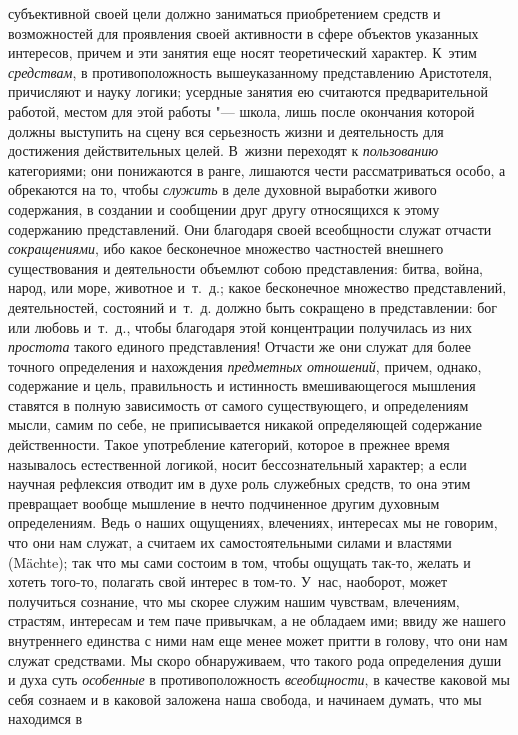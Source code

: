 субъективной своей цели должно заниматься приобретением средств и
возможностей для проявления своей активности в сфере объектов указанных
интересов, причем и эти занятия еще носят теоретический характер. К~этим
{\em средствам}, в противоположность вышеуказанному
представлению Аристотеля, причисляют и науку логики; усердные занятия ею
считаются предварительной работой, местом для этой работы "--- школа, лишь
после окончания которой должны выступить на сцену вся серьезность жизни и
деятельность для достижения действительных целей. В~жизни переходят к
{\em пользованию} категориями; они понижаются в ранге,
лишаются чести рассматриваться особо, а обрекаются на то, чтобы
{\em служить} в деле духовной выработки живого
содержания, в создании и сообщении друг другу относящихся к этому
содержанию представлений. Они благодаря своей всеобщности служат отчасти
{\em сокращениями}, ибо какое бесконечное множество
частностей внешнего существования и деятельности объемлют собою
представления: битва, война, народ, или море, животное и~т.~д.; какое
бесконечное множество представлений, деятельностей, состояний и~т.~д.
должно быть сокращено в представлении: бог или любовь и~т.~д., чтобы
благодаря этой концентрации получилась из них
{\em простота} такого единого представления! Отчасти же
они служат для более точного определения и нахождения
{\em предметных отношений}, причем, однако, содержание
и цель, правильность и истинность вмешивающегося мышления ставятся в полную
зависимость от самого существующего, и определениям мысли, самим по себе,
не приписывается никакой определяющей содержание действенности. Такое
употребление категорий, которое в прежнее время называлось естественной
логикой, носит бессознательный характер; а если научная рефлексия отводит
им в духе роль служебных средств, то она этим превращает вообще мышление в
нечто подчиненное другим духовным определениям. Ведь о наших ощущениях,
влечениях, интересах мы не говорим, что они нам служат, а считаем их
самостоятельными силами и властями (Mächte); так что мы сами состоим в том,
чтобы ощущать так-то, желать и хотеть того-то, полагать свой интерес в
том-то. У~нас, наоборот, может получиться сознание, что мы скорее служим
нашим чувствам, влечениям, страстям, интересам и тем паче привычкам, а не
обладаем ими; ввиду же нашего внутреннего единства с ними нам еще менее
может притти в голову, что они нам служат средствами. Мы скоро
обнаруживаем, что такого рода определения души и духа суть
{\em особенные} в противоположность
{\em всеобщности}, в качестве каковой мы себя сознаем и
в каковой заложена наша свобода, и начинаем думать, что мы находимся в
